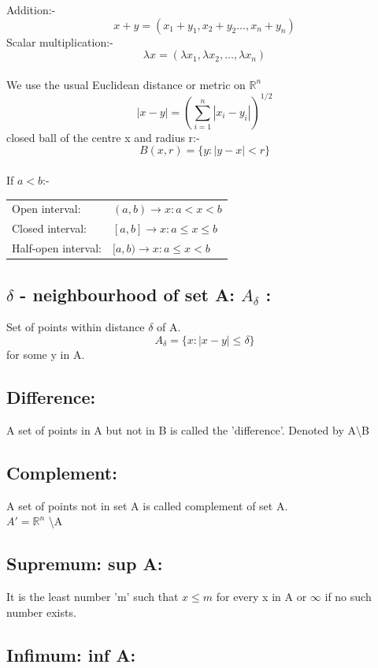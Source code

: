 \documentclass[14pt]{extarticle}
\begin{document}
\begin{enumerate}
Addition:- $$ x+y=(x_1+y_1,x_2+y_2...,x_n+y_n)$$
Scalar multiplication:- $$\lambda x=(\lambda x_1,\lambda x_2,...,\lambda x_n)$$\\
We use the usual Euclidean distance or metric on $\mathbb{R}^n$\\
$$|x-y|=\left(\sum_{i=1}^{n}|x_i-y_i|\right)^{1/2}$$
closed ball of the centre x and radius r:-\\
$$B(x,r)=\{y:|y-x|<r\}$$\\
If $a<b$:-\\

\begin{tabular}{ll}
Open interval:&$(a,b) \rightarrow{x:a<x<b}$\\
Closed interval:&$[a,b] \rightarrow{x:a\leq x\leq b}$\\
Half-open interval:&$[a,b) \rightarrow{x:a\leq x<b}$\\
\end{tabular}

\subsection{$\delta$ - neighbourhood of set A: $A_\delta$ :}

Set of points within distance $\delta$ of A.\\
$$A_\delta = \{x:|x-y|\leq\delta\}$$ for some y in A.
\subsection{Difference:}  
A set of points in A but not in B is called the 'difference'. Denoted by A\textbackslash B 
\subsection{Complement:}
A set of points not in set A is called complement of set A.\\ 
$ A'=\mathbb{R}^n$ \textbackslash A

\subsection{Supremum: sup A:}
It is the least number 'm' such that $x\leq m$ for every x in A or $\infty$ if no such number exists.

\subsection{Infimum: inf A:}


\end{enumerate}
\end{document}
